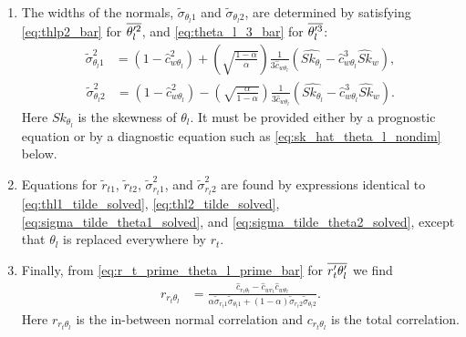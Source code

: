 \begin{enumerate}
    \item The widths of the normals, $\tilde{\sigma}_{\theta_l 1}$ and $\tilde{\sigma}_{\theta_l 2}$,
    are determined by satisfying \cref{eq:thlp2_bar} for $\overline{\theta_l'^2}$,
    and \cref{eq:theta_l_3_bar} for $\overline{\theta_l'^3}$:
    \begin{align}
        \label{eq:sigma_tilde_theta1_solved}
        \tilde{\sigma}_{\theta_l 1}^2
        &= \left(1-\widehat{c}_{w \theta_l}^2 \right) +
        \left(\sqrt{\frac{1 - \alpha}{\alpha}}\right)
        \frac{1}{3 \widehat{c}_{w \theta_l}}
        \left( \widehat{Sk_{\theta_l}} - \widehat{c}_{w \theta_l}^3 \widehat{Sk}_w \right),
    \end{align}
    \begin{align}
        \label{eq:sigma_tilde_theta2_solved}
        \tilde{\sigma}_{\theta_l 2}^2
        &= \left(1 - \widehat{c}_{w \theta_l}^2 \right) -
        \left(\sqrt{\frac{\alpha}{1 - \alpha}}\right)
        \frac{1}{3 \widehat{c}_{w \theta_l}}
        \left( \widehat{Sk_{\theta_l}} - \widehat{c}_{w \theta_l}^3 \widehat{Sk}_w \right).
    \end{align}
    Here $Sk_{\theta_l}$ is the skewness of $\theta_l$.
    It must be provided either by a prognostic equation or by a diagnostic equation
    such as \cref{eq:sk_hat_theta_l_nondim} below.

    \item Equations for $\tilde{r}_{t1}$, $\tilde{r}_{t2}$, $\tilde{\sigma}_{r_t 1}^2$,
    and $\tilde{\sigma}_{r_t 2}^2$ are found by expressions identical to \cref{eq:thl1_tilde_solved},
    \cref{eq:thl2_tilde_solved}, \cref{eq:sigma_tilde_theta1_solved},
    and \cref{eq:sigma_tilde_theta2_solved}, except that $\theta_l$ is replaced everywhere by $r_t$.

    \item Finally, from \cref{eq:r_t_prime_theta_l_prime_bar} for $\overline{r_t' \theta_l'}$ we find
    \begin{align}
        \label{eq:r_r_t_theta_l}
        r_{r_t \theta_l}
        &= \frac{\widehat{c}_{r_t \theta_l} - \widehat{c}_{w r_t} \widehat{c}_{w \theta_l}}
        {\alpha \tilde{\sigma}_{r_{t}1}\tilde{\sigma}_{\theta_{l}1} +
            (1-\alpha) \tilde{\sigma}_{r_{t}2} \tilde{\sigma}_{\theta_{l}2}}.
    \end{align}
    Here $r_{r_t \theta_l}$ is the in-between normal correlation and $c_{r_t \theta_l}$
    is the total correlation.
\end{enumerate}